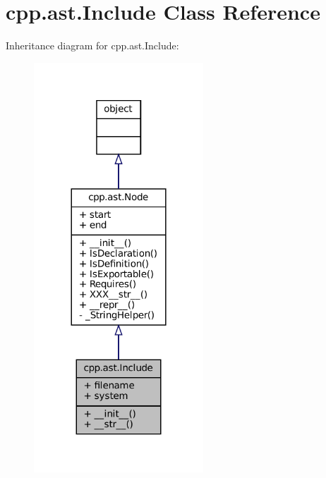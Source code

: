 \hypertarget{classcpp_1_1ast_1_1Include}{}\section{cpp.\+ast.\+Include Class Reference}
\label{classcpp_1_1ast_1_1Include}


Inheritance diagram for cpp.\+ast.\+Include\+:
\nopagebreak
\begin{figure}[H]
\begin{center}
\leavevmode
\includegraphics[width=180pt]{classcpp_1_1ast_1_1Include__inherit__graph}
\end{center}
\end{figure}


